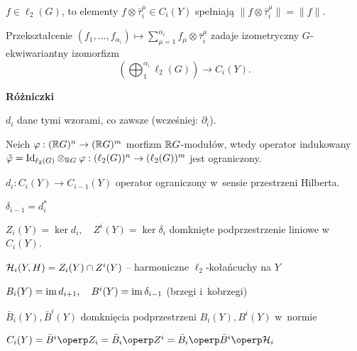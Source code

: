 \begin{uwaga}
	$f \in \ell_2(G)$, to elementy 
	$f \otimes \bar{\tau}_i^\mu \in C_i(Y)$ spełniają
	$\| f \otimes \bar{\tau}_i^\mu\| = \| f \|$.
\end{uwaga}

\begin{wniosek}
	Przekształcenie $(f_1, \ldots, f_{\alpha_i}) 
	\mapsto \sum_{\mu = 1}^{\alpha_i} f_\mu \otimes \bar{\tau}_i^\mu$
	zadaje izometryczny $G$-ekwiwariantny izomorfizm
	$$\left( \bigoplus_1^{\alpha_i} \ell_2(G) \right) \to C_i(Y).$$
\end{wniosek}

{\bf Różniczki}

\begin{definicja}
	$d_i$ dane tymi wzorami, co zawsze (wcześniej: $\partial_i$).
\end{definicja}

\begin{lemat}
	Neich $\varphi: ({\mathbb{R}} G)^n \to ({\mathbb{R}} G)^m$ morfizm ${\mathbb{R}} G$-modułów,
	wtedy operator indukowany
	${\tilde{\varphi} = {\mathrm{Id}}_{\ell_2(G)} \otimes_{{\mathbb{R}} G} \varphi
	: (\ell_2(G))^n \to (\ell_2(G))^m}$
	jest ograniczony.
\end{lemat}

\begin{wniosek}
	$d_i: C_i(Y) \to C_{i-1}(Y)$ operator ograniczony 
	w~sensie przestrzeni Hilberta.
\end{wniosek}

\begin{definicja}
	$\delta_{i-1} = d_i^\ast$
	
	$Z_i(Y) = \ker d_i, \quad Z^i(Y) = \ker \delta_i$ 
	domknięte podprzestrzenie liniowe w~$C_i(Y)$.
\end{definicja}

\begin{definicja}
	${\mathcal{H}}_i(Y,H) = Z_i(Y) \cap Z^i(Y)$ 
	-- harmoniczne $\ell_2$-kołańcuchy na $Y$
	
	$B_i(Y) = {\mathrm{im}\,} d_{i+1}, \quad B^i(Y) = {\mathrm{im}\,} \delta_{i-1}$ 
	(brzegi i~kobrzegi)
	
	$\bar{B}_i(Y), \bar{B}^i(Y)$ domknięcia podprzestrzeni
	$B_i(Y), B^i(Y)$ w~normie
\end{definicja}

\begin{stwierdzenie}
	$C_i(Y) = \bar{B}^i \operp Z_i = \bar{B}_i \operp Z^i
	= \bar{B}_i \operp \bar{B}^i \operp \H_i$
\end{stwierdzenie}

